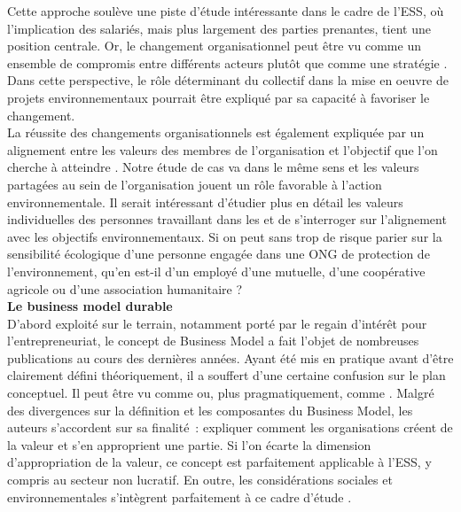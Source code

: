             Cette approche soulève une piste d'étude intéressante dans le cadre de l'ESS, où l'implication des salariés, mais plus largement des parties prenantes, tient une position centrale. Or, le changement organisationnel peut être vu comme un ensemble de compromis entre différents acteurs plutôt que comme une stratégie  \parencite{staw2000what}. Dans cette perspective, le rôle déterminant du collectif dans la mise en oeuvre de projets environnementaux pourrait être expliqué par sa capacité à favoriser le changement. \\

            La réussite des changements organisationnels est également expliquée par un alignement entre les valeurs des membres de l'organisation et l'objectif que l'on cherche à atteindre \parencite{burnes2011success}. Notre étude de cas va dans le même sens et les valeurs partagées au sein de l'organisation jouent un rôle favorable à l'action environnementale. Il serait intéressant d'étudier plus en détail les valeurs individuelles des personnes travaillant dans les \eess et de s'interroger sur l'alignement avec les objectifs environnementaux. Si on peut sans trop de risque parier sur la sensibilité écologique d'une personne engagée dans une ONG de protection de l'environnement, qu'en est-il d'un employé d'une mutuelle, d'une coopérative agricole ou d'une association humanitaire ? \\

        \textbf{Le business model durable} \\
            D'abord exploité sur le terrain, notamment porté par le regain d'intérêt pour l'entrepreneuriat, le concept de Business Model a fait l'objet de nombreuses publications au cours des dernières années. Ayant été mis en pratique avant d’être clairement défini théoriquement, il a souffert d’une certaine confusion sur le plan conceptuel. Il peut être vu comme  \parencite{magretta2002why} ou, plus pragmatiquement, comme  \parencite{lecocq2006business}. Malgré des divergences sur la définition et les composantes du Business Model, les auteurs s’accordent sur sa finalité : expliquer comment les organisations créent de la valeur et s’en approprient une partie. Si l'on écarte la dimension d'appropriation de la valeur, ce concept est parfaitement applicable à l'ESS, y compris au secteur non lucratif. En outre, les considérations sociales et environnementales s'intègrent parfaitement à ce cadre d'étude \parencite{birkin2009new, bocken2014literature, boons2013business, upward2016ontology}.\\

